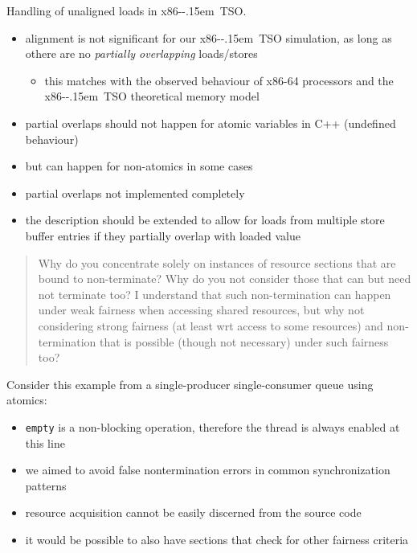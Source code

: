 \documentclass[aspectratio=169, fi]{paradise-slide}
\newcommand{\xtso}{\mbox{x86-\kern-.15em TSO}\xspace}
\newcommand{\rquote}[1]{\begin{quote}#1\end{quote}\bigskip\setlength{\leftmargini}{1em}}
\begin{document}
\begin{frame}[noframenumbering]{\qtitle}
  Handling of unaligned loads in \xtso.\bigskip

  \begin{itemize}
    \item alignment is not significant for our \xtso simulation, as long as othere are no
      \emph{partially overlapping} loads/stores
      \begin{itemize}
        \item this matches with the observed behaviour of x86-64 processors and the \xtso
          theoretical memory model
      \end{itemize}
    \item partial overlaps should not happen for atomic variables in C++ (undefined behaviour)
    \item but can happen for non-atomics in some cases
    \bigskip
    \item partial overlaps not implemented completely
    \item the description should be extended to allow for loads from multiple store buffer entries
      if they partially overlap with loaded value
  \end{itemize}
\end{frame}

\begin{frame}{\qtitle}
  \rquote{Why do you concentrate solely on instances of resource sections that are bound to
    non-terminate? Why do you not consider those that can but need not terminate too? I understand
    that such non-termination can happen under weak fairness when accessing shared resources, but
    why not considering strong fairness (at least wrt access to some resources) and non-termination
    that is possible (though not necessary) under such fairness too?}

  Consider this example from a single-producer single-consumer queue using atomics:
  \begin{cppcode}
    T &front() {
        while ( empty() ) { /* wait */ }
        // ...
  \end{cppcode}
  \begin{itemize}
    \item \texttt{empty} is a non-blocking operation, therefore the thread is always enabled at this line
    \item we aimed to avoid false nontermination errors in common synchronization patterns
    \item resource acquisition cannot be easily discerned from the source code
    \item it would be possible to also have sections that check for other fairness criteria
  \end{itemize}
\end{frame}
\end{document}
